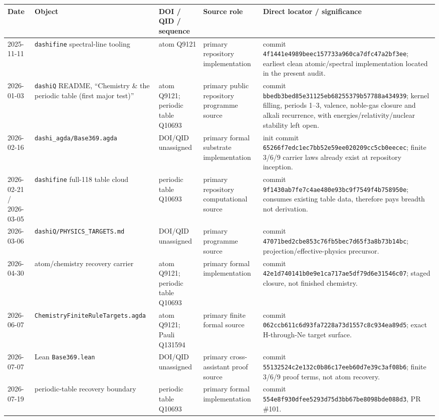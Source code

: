 \begin{longtable}{p{}p{}p{}p{}p{}}
\toprule
Date & Object & DOI / QID / sequence & Source role & Direct locator / significance\\
\midrule
\endhead
2025-11-11 & \texttt{dashifine} spectral-line tooling & atom Q9121 & primary repository implementation & commit \texttt{4f1441e4989beec157733a960ca7dfc47a2bf3ee}; earliest clean atomic/spectral implementation located in the present audit.\\
2026-01-03 & \texttt{dashiQ} README, ``Chemistry \& the periodic table (first major test)'' & atom Q9121; periodic table Q10693 & primary public repository programme source & commit \texttt{bbedb3bed85e31125eb68255379b57788a434939}; kernel filling, periods 1--3, valence, noble-gas closure and alkali recurrence, with energies/relativity/nuclear stability left open.\\
2026-02-16 & \texttt{dashi\_agda/Base369.agda} & DOI/QID unassigned & primary formal substrate implementation & init commit \texttt{65266f7edc1ec7bb52e59ee020209cc5cb0eecec}; finite 3/6/9 carrier laws already exist at repository inception.\\
2026-02-21 / 2026-03-05 & \texttt{dashifine} full-118 table cloud & periodic table Q10693 & primary repository computational source & commit \texttt{9f1430ab7fe7c4ae480e93bc9f7549f4b758950e}; consumes existing table data, therefore pays breadth not derivation.\\
2026-03-06 & \texttt{dashiQ/PHYSICS\_TARGETS.md} & DOI/QID unassigned & primary programme source & commit \texttt{47071bed2cbe853c76fb5bec7d65f3a8b73b14bc}; projection/effective-physics precursor.\\
2026-04-30 & atom/chemistry recovery carrier & atom Q9121; periodic table Q10693 & primary formal implementation & commit \texttt{42e1d740141b0e9e1ca717ae5df79d6e31546c07}; staged closure, not finished chemistry.\\
2026-06-07 & \texttt{ChemistryFiniteRuleTargets.agda} & atom Q9121; Pauli Q131594 & primary finite formal source & commit \texttt{062ccb611c6d93fa7228a73d1557c8c934ea89d5}; exact H-through-Ne target surface.\\
2026-07-07 & Lean \texttt{Base369.lean} & DOI/QID unassigned & primary cross-assistant proof source & commit \texttt{55132524c2e132c0b86c17eeb60d7e39c3af08b6}; finite 3/6/9 proof terms, not atom recovery.\\
2026-07-19 & periodic-table recovery boundary & periodic table Q10693 & primary formal implementation & commit \texttt{554e8f930dfee5293d75d3bb67be8098bde088d3}, PR \#101.\\

\end{longtable}
